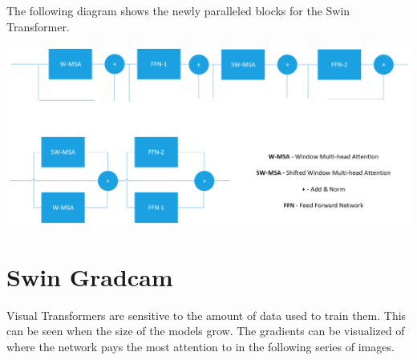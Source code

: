 \documentclass[10pt,twocolumn,letterpaper]{article}
\begin{document}
The following diagram shows the newly paralleled blocks for the Swin Transformer.

\includegraphics[width=0.8\linewidth]{docs/latex/images/brandon/MSA-Swin.png}
\clearpage

\section{Swin Gradcam} \label{SwinGradCamRefs}

Visual Transformers are sensitive to the amount of data used to train them. This can be seen when the size of the models grow. The gradients can be visualized of where the network pays the most attention to in the following series of images.

\end{document}
